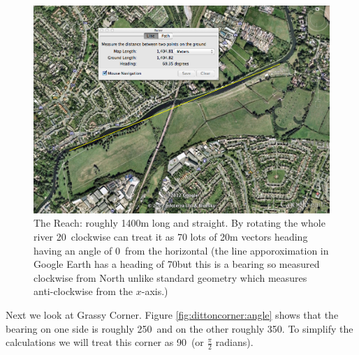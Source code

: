       \begin{figure}
      \begin{center}
        \includegraphics[scale=0.3]{images/TheReach.png}
        \caption{The Reach: roughly 1400m long and straight. By rotating the whole river 20\textdegree \ clockwise can treat it as 70 lots of 20m vectors heading having an angle of 0\textdegree \ from the horizontal (the line apporoximation in Google Earth has a heading of 70\textdegree but this is a bearing so measured clockwise from North unlike standard geometry which measures anti-clockwise from the $x$-axis.)}
        \label{fig:thereach}
      \end{center}
      \end{figure}
      
      Next we look at Grassy Corner. Figure \ref{fig:dittoncorner:angle} shows that the bearing on one side is roughly 250\textdegree\  and on the other roughly 350\textdegree. To simplify the calculations we will treat this corner as 90\textdegree\ (or $\frac{\pi}{2}$ radians).
      
